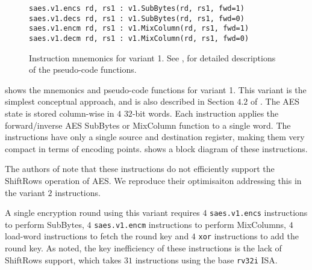 
\begin{figure}
\begin{lstlisting}[language=pseudo,style=block]
saes.v1.encs rd, rs1 : v1.SubBytes(rd, rs1, fwd=1)
saes.v1.decs rd, rs1 : v1.SubBytes(rd, rs1, fwd=0)
saes.v1.encm rd, rs1 : v1.MixColumn(rd, rs1, fwd=1)
saes.v1.decm rd, rs1 : v1.MixColumn(rd, rs1, fwd=0)
\end{lstlisting}
\caption{
    Instruction mnemonics for variant 1.
    See ,  for detailed
    descriptions of the pseudo-code functions.
}
\label{fig:mnemonics:v1}
\end{figure}

 shows the mnemonics and pseudo-code functions
for variant 1.
This variant is the simplest conceptual approach, and
is also described in Section $4.2$ of \cite{TilGro:06}.
The AES state is stored column-wise in $4$ $32$-bit words.
Each instruction applies the forward/inverse AES SubBytes or
MixColumn function to a single word.
The instructions have only a single source and destination register,
making them very compact in terms of encoding points.
 shows a block diagram of these
instructions.

The authors of \cite{TilGro:06} note that these instructions do not
efficiently support the ShiftRows operation of AES.  We reproduce their
optimisaiton addressing this in the variant $2$ instructions.

A single encryption round using this variant requires
$4$ {\tt saes.v1.encs} instructions to perform SubBytes,
$4$ {\tt saes.v1.encm} instructions to perform MixColumns,
$4$ load-word instructions to fetch the round key
and
$4$ {\tt xor} instructions to add the round key.
As noted, the key inefficiency of these instructions is the
lack of ShiftRows support, which takes $31$ instructions using the
base {\tt rv32i} ISA.

